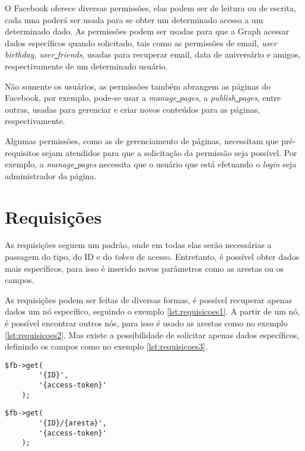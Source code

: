 O Facebook oferece diversas permissões, elas podem ser de leitura ou de escrita, cada uma poderá ser usada para se obter um determinado acesso a um determinado dado. As permissões podem ser usadas para que a Graph acessar dados específicos quando solicitado, tais como as permissões de email, \textit{user\underline{{ }}birthday}, \textit{user\underline{{ }}friends}, usadas para recuperar email, data de aniversário e amigos, respectivamente de um determinado usuário.

Não somente os usuários, as permissões também abrangem as páginas do Facebook, por exemplo, pode-se usar a \textit{manage\underline{{ }}pages}, a \textit{publish\underline{{ }}pages}, entre outras, usadas para gerenciar e criar novos conteúdos para as páginas, respectivamente.

Algumas permissões, como as de gerenciamento de páginas, necessitam que pré-requisitos sejam atendidos para que a solicitação da permissão seja possível. Por exemplo, a \textit{manage\underline{{ }}pages} necessita que o usuário que está efetuando o \textit{login} seja administrador da página.

\section{Requisições}
As requisições seguem um padrão, onde em todas elas serão necessárias a passagem do tipo, do ID e do \textit{token} de acesso. Entretanto, é possível obter dados mais específicos, para isso é inserido novos parâmetros como as arestas ou os campos. 

As requisições podem ser feitas de diversas formas, é possível recuperar apenas dados um nó específico, seguindo o exemplo \ref{lst:requisicoes1}. A partir de um nó, é possível encontrar outros nós, para isso é usado as arestas como no exemplo \ref{lst:requisicoes2}. Mas existe a possibilidade de solicitar apenas dados específicos, definindo os campos como no exemplo \ref{lst:requisicoes3}.  

\begin{lstlisting}[caption={Requisição com o uso do ID},label={lst:requisicoes1}]
	$fb->get(
    	'{ID}',
    	'{access-token}'
  	);
\end{lstlisting}

\begin{lstlisting}[caption={Requisição com o uso do ID+aresta},label={lst:requisicoes2}]
	$fb->get(
    	'{ID}/{aresta}',
    	'{access-token}'
  	);
\end{lstlisting}

